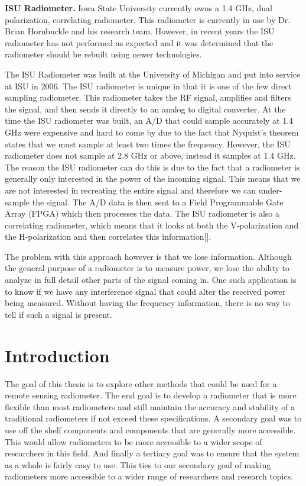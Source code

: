 \textbf{ISU Radiometer.}  Iowa State University currently owns a 1.4 GHz, dual polarization, correlating radiometer.  This radiometer is currently in use by Dr. Brian Hornbuckle and his research team.  However, in recent years the ISU radiometer has not performed as expected and it was determined that the radiometer should be rebuilt using newer technologies.  

The ISU Radiometer was built at the University of Michigan and put into service at ISU in 2006.  The ISU radiometer is unique in that it is one of the few direct sampling radiometer.  This radiometer takes the RF signal, amplifies and filters the signal, and then sends it directly to an analog to digital converter.  At the time the ISU radiometer was built, an A/D that could sample accurately at 1.4 GHz were expensive and hard to come by due to the fact that Nyquist's theorem states that we must sample at least two times the frequency.  However, the ISU radiometer does not sample at 2.8 GHz or above, instead it samples at 1.4 GHz.  The reason the ISU radiometer can do this is due to the fact that a radiometer is generally only interested in the power of the incoming signal.  This means that we are not interested in recreating the entire signal and therefore we can under-sample the signal.  The A/D data is then sent to a Field Programmable Gate Array (FPGA) which then processes the data.  The ISU radiometer is also a correlating radiometer, which means that it looks at both the V-polarization and the H-polarization and then correlates this information[\cite{Fischman2001}]. 

The problem with this approach however is that we lose information.  Although the general purpose of a radiometer is to measure power, we lose the ability to analyze in full detail other parts of the signal coming in.  One such application is to know if we have any interference signal that could alter the received power being measured.  Without having the frequency information, there is no way to tell if such a signal is present.

\section{Introduction}
The goal of this thesis is to explore other methods that could be used for a remote sensing radiometer.  The end goal is to develop a radiometer that is more flexible than most radiometers and still maintain the accuracy and stability of a traditional radiometers if not exceed these specifications.  A secondary goal was to use off the shelf components and components that are generally more accessible.  This would allow radiometers to be more accessible to a wider scope of researchers in this field.  And finally a tertiary goal was to ensure that the system as a whole is fairly easy to use.  This ties to our secondary goal of making radiometers more accessible to a wider range of researchers and research topics.

